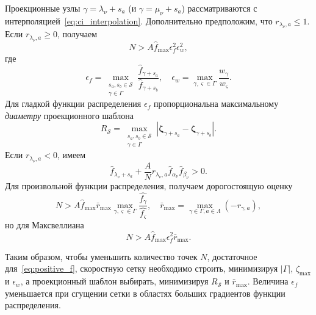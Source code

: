 \documentclass[
aps,%
12pt,%
final,%
notitlepage,%
oneside,%
onecolumn,%
nobibnotes,%
nofootinbib,%
superscriptaddress,%
noshowpacs,%
showkeys,%
floatfix,%
tightenlines,%
centertags]%
{revtex4}
\newcommand{\bzeta}{\boldsymbol{\zeta}}
\begin{document}
Проекционные узлы \(\gamma = \lambda_\nu+s_a\) (и \(\gamma = \mu_\nu+s_a\))
рассматриваются с интерполяцией~\eqref{eq:ci_interpolation}.
Дополнительно предположим, что \(r_{\lambda_\nu,a} \leq 1\).
Если \(r_{\lambda_\nu,a} \geq 0\), получаем
\begin{equation}\label{eq:positive_f_lambda2+}
    N > A \hat{f}_{\max} \epsilon_f^2 \epsilon_w^2,
\end{equation}
где
\begin{equation}\label{eq:epsilon_f}
    \epsilon_f = \max_{\substack{s_a,s_b\in\mathcal{S}\\\gamma\in\Gamma}} \frac{\hat{f}_{\gamma+s_a}}{\hat{f}_{\gamma+s_b}}, \quad
    \epsilon_w = \max_{\gamma,\varsigma\in\Gamma} \frac{w_\gamma}{w_\varsigma}.
\end{equation}
Для гладкой функции распределения \(\epsilon_f\) пропорциональна максимальному \emph{диаметру} проекционного шаблона
\begin{equation}\label{eq:stencil_diameter}
    R_\mathcal{S} = \max_{\substack{s_a,s_b\in\mathcal{S}\\\gamma\in\Gamma}}
        \left| \bzeta_{\gamma+s_a} - \bzeta_{\gamma+s_b} \right|.
\end{equation}
Если \(r_{\lambda_\nu,a} < 0\), имеем
\begin{equation}\label{eq:positive_f_lambda-}
    \hat{f}_{\lambda_\nu+s_a} + \frac{A}{N}r_{\lambda_\nu,a} \hat{f}_{\alpha_\nu}\hat{f}_{\beta_\nu} > 0.
\end{equation}
Для произвольной функции распределения, получаем дорогостоящую оценку
\begin{equation}\label{eq:positive_f_lambda2-}
    N > A \hat{f}_{\max} \bar{r}_{\max} \max_{\gamma,\varsigma\in\Gamma}\frac{\hat{f_\gamma}}{\hat{f_\varsigma}}, \quad
    \bar{r}_{\max} = \max_{\gamma\in\Gamma,a\in\Lambda}( -r_{\gamma,a} ),
\end{equation}
но для Максвеллиана
\begin{equation}\label{eq:positive_f_lambda2-maxw}
    N > A \hat{f}_{\max} \epsilon_f^2 \bar{r}_{\max}.
\end{equation}

Таким образом, чтобы уменьшить количество точек \(N\), достаточное для~\eqref{eq:positive_f},
скоростную сетку необходимо строить, минимизируя \(|\Gamma|\), \(\zeta_{\max}\) и \(\epsilon_w\),
а проекционный шаблон выбирать, минимизируя \(R_\mathcal{S}\) и \(\bar{r}_{\max}\).
Величина \(\epsilon_f\) уменьшается при сгущении сетки в областях больших градиентов функции распределения.
\end{document}
